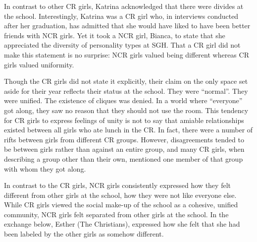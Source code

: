 \label{cliques}

\vspace{5 mm}

\noindent In contrast to other CR girls, Katrina acknowledged that there were divides at the school.  Interestingly, Katrina was a CR girl who, in interviews conducted after her graduation, has admitted that she would have liked to have been better friends with NCR girls.   Yet it took a NCR girl, Bianca, to state that she appreciated the diversity of personality types at SGH. That a CR girl did not make this statement is no surprise: NCR girls valued being different whereas CR girls valued uniformity.

Though the CR girls did not state it explicitly, their claim on the only space set aside for their year reflects their status at the school.  They were ``normal''.  They were unified.  The existence of cliques was denied.  In a world where ``everyone'' got along, they saw no reason that they should not use the room.  This tendency for CR girls to express feelings of unity is not to say that amiable relationships existed between all girls who ate lunch in the CR.  In fact, there were a number of rifts between girls from different CR groups.  However, disagreements tended to be between girls rather than against an entire group, and many CR girls, when describing a group other than their own, mentioned one member of that group with whom they got along.

In contrast to the CR girls, NCR girls consistently expressed how they felt different from other girls at the school, how they were not like everyone else.  While CR girls viewed the social make-up of the school as a cohesive, unified community, NCR girls felt separated from other girls at the school. In the exchange below, Esther (The Christians), expressed how she felt that she had been labeled by the other girls as somehow different.

